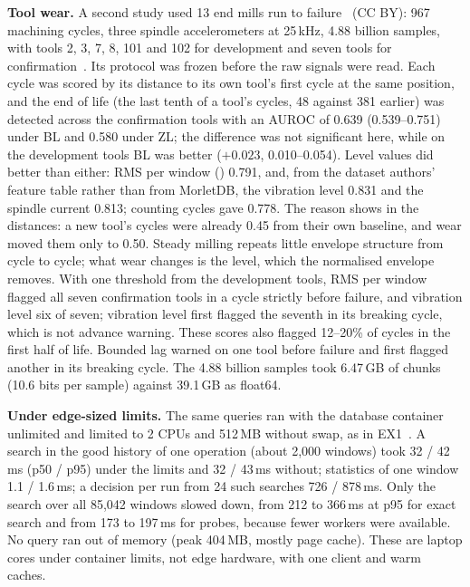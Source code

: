 \documentclass[sigconf]{acmart}
\newcommand{\M}{MorletDB}
\begin{document}
\textbf{Tool wear.} A second study used 13 end mills run to failure~\cite{toollife} (CC BY): 967 machining cycles,
three spindle accelerometers at 25\,kHz, 4.88 billion samples, with tools 2, 3, 7, 8, 101 and 102 for development and
seven tools for confirmation~\cite{iu2}. Its protocol was frozen before the raw signals were read. Each cycle was scored
by its distance to its own tool's first cycle at the same position, and the end of life (the last tenth of a tool's
cycles, 48 against 381 earlier) was detected across the confirmation tools with an AUROC of 0.639 (0.539--0.751) under
BL and 0.580 under ZL; the difference was not significant here, while on the development tools BL was better
($+0.023$, 0.010--0.054). Level values did better than either: RMS per window () 0.791,
and, from the dataset authors' feature table rather than from \M{}, the vibration level 0.831 and the spindle current
0.813; counting cycles gave 0.778. The reason shows in the distances: a new tool's cycles were already 0.45 from their
own baseline, and wear moved them only to 0.50. Steady milling repeats little envelope structure from cycle to
cycle; what wear changes is the level, which the normalised envelope removes. With one threshold from the
development tools, RMS per window flagged all seven confirmation tools in a cycle strictly before failure, and vibration level six of seven; vibration level first flagged the seventh in its breaking cycle, which is not advance warning. These scores also flagged 12--20\% of cycles in the first half of life. Bounded lag warned on one tool before failure and first flagged another in its breaking cycle. The 4.88 billion samples took 6.47\,GB of chunks (10.6 bits per
sample) against 39.1\,GB as float64.

\textbf{Under edge-sized limits.} The same queries ran with the database container unlimited and limited to 2 CPUs
and 512\,MB without swap, as in EX1~\cite{iu1e}. A search in the good history of one operation (about 2,000 windows)
took 32 / 42\,ms (p50 / p95) under the limits and 32 / 43\,ms without; statistics of one window 1.1 / 1.6\,ms; a
decision per run from 24 such searches 726 / 878\,ms. Only the search over all 85,042 windows slowed down, from 212 to
366\,ms at p95 for exact search and from 173 to 197\,ms for probes, because fewer workers were available. No query
ran out of memory (peak 404\,MB, mostly page cache). These are laptop cores under container limits, not edge
hardware, with one client and warm caches.
\end{document}
